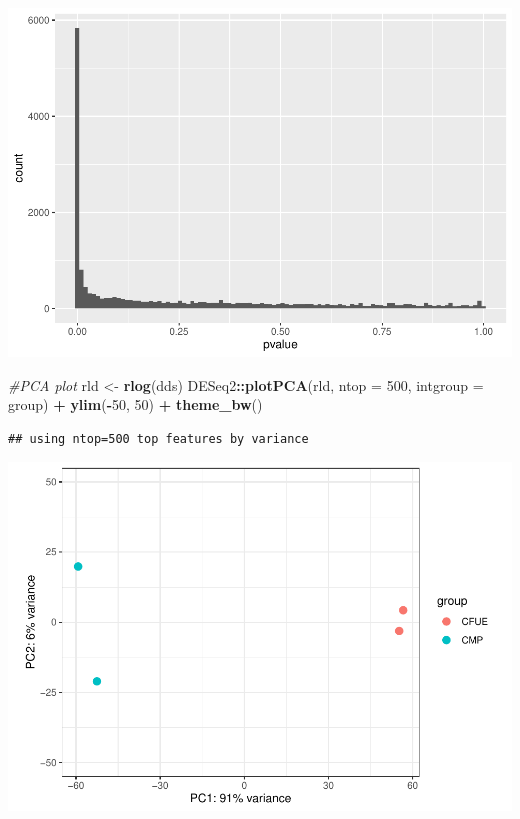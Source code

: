 \documentclass[
]{article}
\newenvironment{Shaded}{\begin{snugshade}}{\end{snugshade}}
\newcommand{\AttributeTok}[1]{\textcolor[rgb]{0.13,0.29,0.53}{#1}}
\newcommand{\CommentTok}[1]{\textcolor[rgb]{0.56,0.35,0.01}{\textit{#1}}}
\newcommand{\DecValTok}[1]{\textcolor[rgb]{0.00,0.00,0.81}{#1}}
\newcommand{\FunctionTok}[1]{\textcolor[rgb]{0.13,0.29,0.53}{\textbf{#1}}}
\newcommand{\NormalTok}[1]{#1}
\newcommand{\OtherTok}[1]{\textcolor[rgb]{0.56,0.35,0.01}{#1}}
\newcommand{\SpecialCharTok}[1]{\textcolor[rgb]{0.81,0.36,0.00}{\textbf{#1}}}
\newcommand{\StringTok}[1]{\textcolor[rgb]{0.31,0.60,0.02}{#1}}
\begin{document}
\includegraphics{RNA_Analysis_23_files/figure-latex/diag plots-2.pdf}

\begin{Shaded}
\begin{Highlighting}[]
\CommentTok{\#PCA plot}
\NormalTok{rld }\OtherTok{\textless{}{-}} \FunctionTok{rlog}\NormalTok{(dds)}
\NormalTok{DESeq2}\SpecialCharTok{::}\FunctionTok{plotPCA}\NormalTok{(rld, }\AttributeTok{ntop =} \DecValTok{500}\NormalTok{, }\AttributeTok{intgroup =} \StringTok{\textquotesingle{}group\textquotesingle{}}\NormalTok{) }\SpecialCharTok{+} 
  \FunctionTok{ylim}\NormalTok{(}\SpecialCharTok{{-}}\DecValTok{50}\NormalTok{, }\DecValTok{50}\NormalTok{) }\SpecialCharTok{+} \FunctionTok{theme\_bw}\NormalTok{()}
\end{Highlighting}
\end{Shaded}

\begin{verbatim}
## using ntop=500 top features by variance
\end{verbatim}

\includegraphics{RNA_Analysis_23_files/figure-latex/diag plots-3.pdf}
\end{document}
